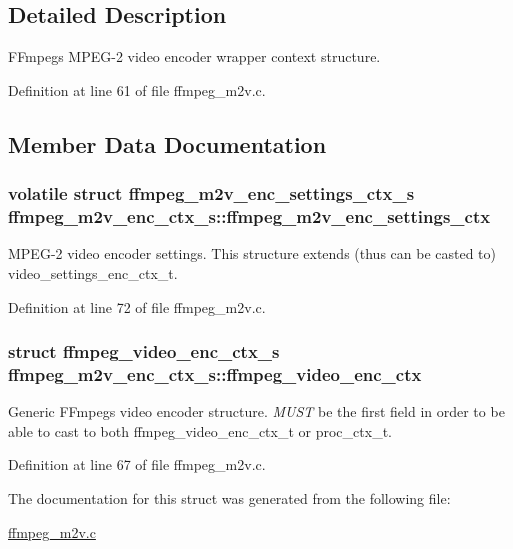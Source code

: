 \subsection{Detailed Description}
F\+Fmpeg\textquotesingle{}s M\+P\+E\+G-\/2 video encoder wrapper context structure. 

Definition at line 61 of file ffmpeg\+\_\+m2v.\+c.



\subsection{Member Data Documentation}
\subsubsection[{\texorpdfstring{ffmpeg\+\_\+m2v\+\_\+enc\+\_\+settings\+\_\+ctx}{ffmpeg_m2v_enc_settings_ctx}}]{\setlength{\rightskip}{0pt plus 5cm}volatile struct {\bf ffmpeg\+\_\+m2v\+\_\+enc\+\_\+settings\+\_\+ctx\+\_\+s} ffmpeg\+\_\+m2v\+\_\+enc\+\_\+ctx\+\_\+s\+::ffmpeg\+\_\+m2v\+\_\+enc\+\_\+settings\+\_\+ctx}\hypertarget{structffmpeg__m2v__enc__ctx__s_af0bee743203664961f2a75ac872139fd}{}\label{structffmpeg__m2v__enc__ctx__s_af0bee743203664961f2a75ac872139fd}
M\+P\+E\+G-\/2 video encoder settings. This structure extends (thus can be casted to) video\+\_\+settings\+\_\+enc\+\_\+ctx\+\_\+t. 

Definition at line 72 of file ffmpeg\+\_\+m2v.\+c.

\subsubsection[{\texorpdfstring{ffmpeg\+\_\+video\+\_\+enc\+\_\+ctx}{ffmpeg_video_enc_ctx}}]{\setlength{\rightskip}{0pt plus 5cm}struct {\bf ffmpeg\+\_\+video\+\_\+enc\+\_\+ctx\+\_\+s} ffmpeg\+\_\+m2v\+\_\+enc\+\_\+ctx\+\_\+s\+::ffmpeg\+\_\+video\+\_\+enc\+\_\+ctx}\hypertarget{structffmpeg__m2v__enc__ctx__s_aad391a4d54718c539a2dabd196552493}{}\label{structffmpeg__m2v__enc__ctx__s_aad391a4d54718c539a2dabd196552493}
Generic F\+Fmpeg\textquotesingle{}s video encoder structure. {\itshape M\+U\+ST} be the first field in order to be able to cast to both ffmpeg\+\_\+video\+\_\+enc\+\_\+ctx\+\_\+t or proc\+\_\+ctx\+\_\+t. 

Definition at line 67 of file ffmpeg\+\_\+m2v.\+c.



The documentation for this struct was generated from the following file\+:\begin{DoxyCompactItemize}
\item 
\hyperlink{ffmpeg__m2v_8c}{ffmpeg\+\_\+m2v.\+c}\end{DoxyCompactItemize}
